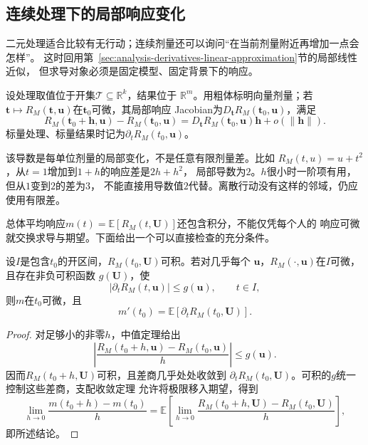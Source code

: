 \subsection{连续处理下的局部响应变化}
\label{sec:causal-local-response}

二元处理适合比较有无行动；连续剂量还可以询问“在当前剂量附近再增加一点会怎样”。
这时回用第~\ref{sec:analysis-derivatives-linear-approximation}节的局部线性近似，
但求导对象必须是固定模型、固定背景下的响应。

\begin{definition}[局部响应导数]
  \label{def:causal-local-response}
  设处理取值位于开集\(\mathcal T\subseteq\mathbb R^k\)，结果位于
  \(\mathbb R^m\)。用粗体标明向量剂量；若
  \(\bm t\mapsto R_M(\bm t,\bm u)\)在\(\bm t_0\)可微，其局部响应
  Jacobian为\(D_{\bm t}R_M(\bm t_0,\bm u)\)，满足
  \[
    R_M(\bm t_0+\bm h,\bm u)-R_M(\bm t_0,\bm u)
    =D_{\bm t}R_M(\bm t_0,\bm u)\bm h+o(\|\bm h\|).
  \]
  标量处理、标量结果时记为\(\partial_tR_M(t_0,\bm u)\)。
\end{definition}

该导数是每单位剂量的局部变化，不是任意有限剂量差。比如
\(R_M(t,u)=u+t^2\)，从\(t=1\)增加到\(1+h\)的响应差是\(2h+h^2\)，
局部导数为\(2\)。\(h\)很小时一阶项有用，但从\(1\)变到\(2\)的差为\(3\)，
不能直接用导数值\(2\)代替。离散行动没有这样的邻域，仍应使用有限差。

总体平均响应\(m(t)=\mathbb E[R_M(t,\bm U)]\)还包含积分，不能仅凭每个人的
响应可微就交换求导与期望。下面给出一个可以直接检查的充分条件。
\begin{theorem}[平均响应的求导]
  \label{thm:causal-response-differentiation}
  设\(I\)是包含\(t_0\)的开区间，\(R_M(t_0,\bm U)\)可积。若对几乎每个
  \(\bm u\)，\(R_M(\cdot,\bm u)\)在\(I\)可微，且存在非负可积函数
  \(g(\bm U)\)，使
  \[
    |\partial_tR_M(t,\bm u)|\leq g(\bm u),
    \qquad t\in I,
  \]
  则\(m\)在\(t_0\)可微，且
  \begin{equation}
    m'(t_0)=\mathbb E[\partial_tR_M(t_0,\bm U)].
    \label{eq:causal-average-response-derivative}
  \end{equation}
\end{theorem}
\begin{proof}
  对足够小的非零\(h\)，中值定理给出
  \[
    \left|
      \frac{R_M(t_0+h,\bm u)-R_M(t_0,\bm u)}{h}
    \right|\leq g(\bm u).
  \]
  因而\(R_M(t_0+h,\bm U)\)可积，且差商几乎处处收敛到
  \(\partial_tR_M(t_0,\bm U)\)。可积的\(g\)统一控制这些差商，支配收敛定理
  允许将极限移入期望，得到
  \[
    \lim_{h\to0}\frac{m(t_0+h)-m(t_0)}{h}
    =
    \mathbb E\!\left[
      \lim_{h\to0}
      \frac{R_M(t_0+h,\bm U)-R_M(t_0,\bm U)}{h}
    \right],
  \]
  即所述结论。
\end{proof}

